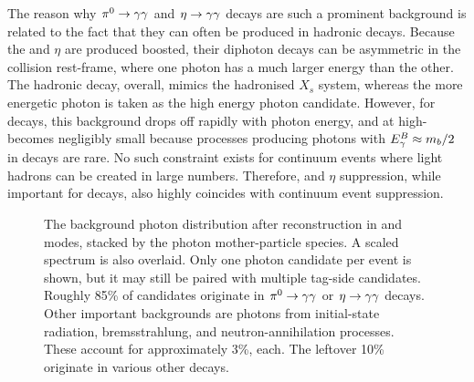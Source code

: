 The reason why $\pi^0\rightarrow\gamma\gamma$ and $\eta\rightarrow\gamma\gamma$ decays are such a prominent background is related to the fact that they can often be produced in hadronic decays.
Because the \piz and $\eta$ are produced boosted, their diphoton decays can be asymmetric in the \epem collision rest-frame, where one photon has a much larger energy than the other.
The hadronic decay, overall, mimics the hadronised $X_s$ system, whereas the more energetic photon is taken as the high energy photon candidate.
However, for \B decays, this background drops off rapidly with photon energy, and at high-\EB becomes negligibly small because processes producing photons with ${E^B_{\gamma}}\approx m_b/2$ in \B decays are rare.
No such constraint exists for continuum events where light hadrons can be created in large numbers.
Therefore, \piz and $\eta$ suppression, while important for \B decays, also highly coincides with continuum event suppression.

\begin{figure}[hbtp!]
    \centering
    \caption{\label{fig:photon_sources} The background photon distribution after reconstruction in \feiBp and \feiBz modes, stacked by the photon mother-particle species.
    A scaled \BtoXsgamma spectrum is also overlaid.
    Only one photon candidate per event is shown, but it may still be paired with multiple tag-side candidates.
    Roughly 85\% of candidates originate in $\pi^0\rightarrow\gamma\gamma$ or $\eta\rightarrow\gamma\gamma$ decays.
    Other important backgrounds are photons from initial-state radiation, bremsstrahlung, and neutron-annihilation processes.
    These account for approximately 3\%, each.
    The leftover 10\% originate in various other decays.}
\end{figure}


